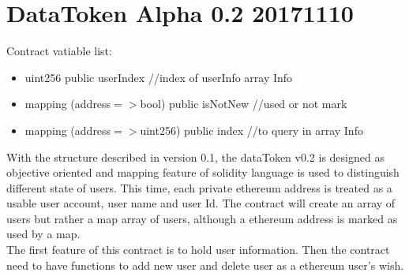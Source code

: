 \section{DataToken Alpha 0.2 20171110}
Contract vatiable list:
\begin{itemize}
    \item uint256 public userIndex //index of userInfo array Info
    \item mapping (address$=>$bool) public isNotNew //used or not mark
    \item mapping (address$=>$uint256) public index //to query in array Info
    
    
\end{itemize}
With the structure described in version 0.1, the dataToken v0.2
is designed as objective oriented and mapping feature of solidity language
is used to distinguish different state of users. This time, each 
private ethereum address is treated as a usable user account, user name
and user Id. The contract will create an array of users but rather a map 
array of users, although a ethereum address is marked as used by a map.\\
The first feature of this contract is to hold user information. Then 
the contract need to have functions to add new user and delete user as
a ethereum user's wish.


